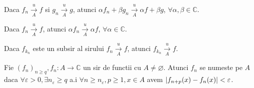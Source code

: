 \documentclass{article}
\begin{document}
\begin{enumerate}
\proprietate Daca $f_n \xrightarrow[A]{u} f$ si $g_n \xrightarrow[A]{u} g$, atunci $\alpha f_n + \beta g_n \xrightarrow[A]{u} \alpha f + \beta g$, $\forall \alpha, \beta \in \mathbb{C}$.

\proprietate Daca $f_n \xrightarrow[A]{u}f$, atunci $\alpha f_n \xrightarrow[A]{u} \alpha f$, $\forall \alpha \in \mathbb{C}$.

\proprietate Daca $f_{k_n}$ este un subsir al sirului $f_n \xrightarrow[A]{u} f$, atunci $f_{k_n} \xrightarrow[A]{u} f$.

   Fie $(f_n)_{n \geq q}, f_n : A \to \mathbb{C}$ un sir de functii cu $A \neq \varnothing$. Atunci $f_n$ se numeste  pe $A$ daca $\forall \varepsilon > 0, \exists n_{\varepsilon} \geq q$ a.i $\forall n \geq n_{\varepsilon}, p \geq 1, x \in A$ avem $\left\lvert f_{n + p}(x) - f_n(x) \right\rvert < \varepsilon$.


\end{enumerate}
\end{document}
